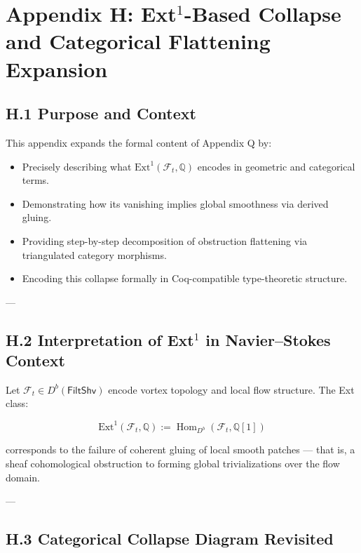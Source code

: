 \documentclass[11pt]{article}
\begin{document}

\section*{Appendix H: Ext$^1$-Based Collapse and Categorical Flattening Expansion}

\subsection*{H.1 Purpose and Context}

This appendix expands the formal content of Appendix Q by:

\begin{itemize}
  \item Precisely describing what \( \mathrm{Ext}^1(\mathcal{F}_t, \mathbb{Q}) \) encodes in geometric and categorical terms.
  \item Demonstrating how its vanishing implies global smoothness via derived gluing.
  \item Providing step-by-step decomposition of obstruction flattening via triangulated category morphisms.
  \item Encoding this collapse formally in Coq-compatible type-theoretic structure.
\end{itemize}

---

\subsection*{H.2 Interpretation of Ext$^1$ in Navier–Stokes Context}

Let \( \mathcal{F}_t \in D^b(\mathsf{FiltShv}) \) encode vortex topology and local flow structure.  
The Ext class:

\[
\mathrm{Ext}^1(\mathcal{F}_t, \mathbb{Q}) := \operatorname{Hom}_{D^b}(\mathcal{F}_t, \mathbb{Q}[1])
\]

corresponds to the failure of coherent gluing of local smooth patches —  
that is, a sheaf cohomological obstruction to forming global trivializations over the flow domain.

---

\subsection*{H.3 Categorical Collapse Diagram Revisited}
\end{document}
